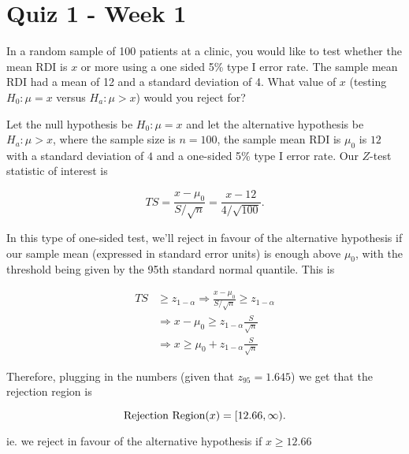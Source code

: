 \documentclass{homework}
\begin{document}
\clearpage

\section{Quiz 1 - Week 1}

\begin{tcolorbox}[title=Question 1]
In a  random sample of 100 patients at a clinic, you would like to test whether the mean RDI is $x$ or more using a one sided 5\% type I error rate. The sample mean RDI had a mean of 12 and a standard deviation of 4. What value of $x$ (testing $H_0 : \mu = x$ versus $H_a : \mu > x$) would you reject for?
\end{tcolorbox}

Let the null hypothesis be $H_0 : \mu = x$ and let the alternative hypothesis be $H_a : \mu > x$, where the sample size is $n=100$, the sample mean RDI is $\mu_0$ is $12$ with a standard deviation of $4$ and a one-sided 5\% type I error rate. Our $Z$-test statistic of interest is 

$$
TS = \frac{x-\mu_0}{S/\sqrt{n}} = \frac{x-12}{4/\sqrt{100}}.
$$

In this type of one-sided test, we'll reject in favour of the alternative hypothesis if our sample mean (expressed in standard error units) is enough above $\mu_0$, with the threshold being given by the 95th standard normal quantile. This is 

\begin{align*}
    TS & \geq z_{1-\alpha} \Rightarrow \frac{x-\mu_0}{S/\sqrt{n}} \geq z_{1-\alpha} \\
    & \Rightarrow x -\mu_0 \geq z_{1-\alpha} \frac{S}{\sqrt{n}} \\
    & \Rightarrow x \geq \mu_ 0 +z_{1-\alpha} \frac{S}{\sqrt{n}} 
\end{align*}

Therefore, plugging in the numbers (given that $z_{95}=1.645$) we get that the rejection region is 

$$
\textnormal{Rejection Region}(x) = [12.66,\infty).
$$

ie. we reject in favour of the alternative hypothesis if $x \geq 12.66$
\end{document}
